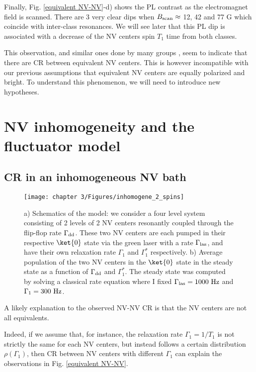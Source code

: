 \documentclass[a4paper,11pt]{report}
\begin{document}
\begin{refsection}
Finally, Fig. \ref{equivalent NV-NV}-d) shows the PL contrast as the electromagnet field is scanned. There are 3 very clear dips when $B_{\rm scan} \approx$ 12, 42 and 77 G which coincide with inter-class resonances. We will see later that this PL dip is associated with a decrease of the NV centers spin $T_1$ time from both classes.

This observation, and similar ones done by many groups \citep{jarmola2012temperature, mrozek2015longitudinal, choi2017depolarization, akhmedzhanov2017microwave, giri2018coupled}, seem to indicate that there are CR between equivalent NV centers. This is however incompatible with our previous assumptions that equivalent NV centers are equally polarized and bright. To understand this phenomenon, we will need to introduce new hypotheses.

\section{NV inhomogeneity and the fluctuator model}

\subsection{CR in an inhomogeneous NV bath}
\begin{figure}[h]
\centering
\texttt{[image: chapter 3/Figures/inhomogene\_2\_spins]}
\caption{a) Schematics of the model: we consider a four level system consisting of 2 levels of 2 NV centers resonantly coupled through the flip-flop rate $\Gamma_{\rm dd}$. These two NV centers are each pumped in their respective $\ket{0}$ state via the green laser with a rate $\Gamma_{\rm las}$, and have their own relaxation rate $\Gamma_1$ and $\Gamma_1^*$ respectively. b) Average population of the two NV centers in the $\ket{0}$ state in the steady state as a function of $\Gamma_{\rm dd}$ and $\Gamma_1^*$. The steady state was computed by solving a classical rate equation where I fixed $\Gamma_{\rm las}=1000\ \rm Hz$ and $\Gamma_1=300\ \rm Hz$.}
\label{inhomogene}
\end{figure}
A likely explanation to the observed NV-NV CR is that the NV centers are not all equivalents.

Indeed, if we assume that, for instance, the relaxation rate $\Gamma_1=1/T_1$ is not strictly the same for each NV centers, but instead follows a certain distribution $\rho(\Gamma_1)$, then CR between NV centers with different $\Gamma_1$ can explain the observations in Fig. \ref{equivalent NV-NV}.


\end{refsection}
\end{document}
